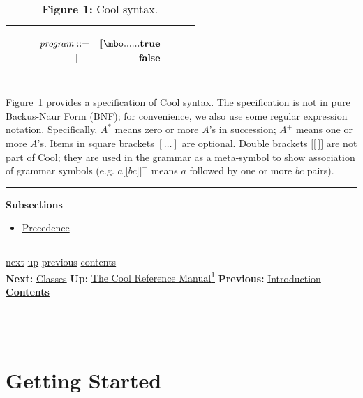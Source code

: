 \documentclass[]{article}
\begin{document}
\begin{longtable}[c]{@{}l@{}}
\hline\noalign{\medskip}
\begin{figure}\begin{eqnarray*}
\mbox {\it program} & ::=& \lbrack\!\lbrack \mbo...
...\mbox {\bf true} \\
& \,\vert\,& \mbox {\bf false}
\end{eqnarray*}
\end{figure}
\\\noalign{\medskip}
\hline
\noalign{\medskip}
\caption{\textbf{Figure 1:} Cool syntax.}
\end{longtable}

Figure~\hyperref[fig1]{1} provides a specification of Cool syntax. The
specification is not in pure Backus-Naur Form (BNF); for convenience, we
also use some regular expression notation. Specifically, $A^{\ast}$
means zero or more $A$'s in succession; $A^+$ means one or more $A$'s.
Items in square brackets $[\ldots]$ are optional. Double brackets
$\lbrack\!\lbrack \, \rbrack\!\rbrack $ are not part of Cool; they are
used in the grammar as a meta-symbol to show association of grammar
symbols (e.g. $a \lbrack\!\lbrack b c \rbrack\!\rbrack ^ {+}$ means $a$
followed by one or more $bc$ pairs).

\begin{center}\rule{3in}{0.4pt}\end{center}

\textbf{Subsections}

\begin{itemize}
\itemsep1pt\parskip0pt
\item
  \href{node40.html}{Precedence}
\end{itemize}

\begin{center}\rule{3in}{0.4pt}\end{center}

\href{node4.html}{next} \href{cool-manual.html}{up}
\href{node2.html}{previous} \href{node1.html}{contents} \\
\textbf{Next:} \href{node4.html}{Classes} \textbf{Up:}
\href{cool-manual.html}{The Cool Reference Manual\textsuperscript{1}}
\textbf{Previous:} \href{node2.html}{Introduction} ~
\textbf{\href{node1.html}{Contents}} \\ \\

\section{\\ Getting Started}
\end{document}
